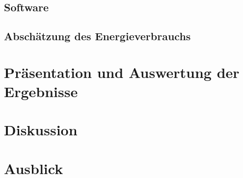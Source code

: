 \documentclass[12pt,titlepage]{article}
\begin{document}
\subsection{Software}
\subsection{Abschätzung des Energieverbrauchs}


\section{Präsentation und Auswertung der Ergebnisse}

\section{Diskussion}

\section{Ausblick}

\newpage
\printbibliography 
\end{document}
